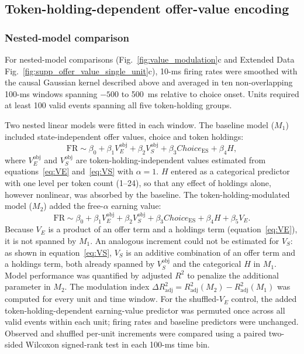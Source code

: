 \documentclass[pdflatex,sn-mathphys-num]{sn-jnl}%
\begin{document}
\subsection{Token-holding-dependent offer-value encoding}

\subsubsection{Nested-model comparison}\label{sec:m_nested}
For nested-model comparisons (Fig.~\ref{fig:value_modulation}c and Extended Data Fig.~\ref{fig:supp_offer_value_single_unit}c), 10-ms firing rates were smoothed with the causal Gaussian kernel described above and averaged in ten non-overlapping 100-ms windows spanning $-500$ to 500~ms relative to choice onset. Units required at least 100 valid events spanning all five token-holding groups.

Two nested linear models were fitted in each window. The baseline model ($M_1$) included state-independent offer values, choice and token holdings:
\begin{equation}
\mathrm{FR} \sim \beta_0 + \beta_1 V_E^{\mathrm{obj}} + \beta_2 V_S^{\mathrm{obj}} + \beta_3 \mathit{Choice}_{\mathrm{ES}} + \beta_4 H,
\end{equation}
where $V_E^{\mathrm{obj}}$ and $V_S^{\mathrm{obj}}$ are token-holding-independent values estimated from equations~\eqref{eq:VE} and~\eqref{eq:VS} with $\alpha=1$. $H$ entered as a categorical predictor with one level per token count (1--24), so that any effect of holdings alone, however nonlinear, was absorbed by the baseline. The token-holding-modulated model ($M_2$) added the free-$\alpha$ earning value:
\begin{equation}
\mathrm{FR} \sim \beta_0 + \beta_1 V_E^{\mathrm{obj}} + \beta_2 V_S^{\mathrm{obj}} + \beta_3 \mathit{Choice}_{\mathrm{ES}} + \beta_4 H + \beta_5 V_E.
\end{equation}
Because $V_E$ is a product of an offer term and a holdings term (equation~\eqref{eq:VE}), it is not spanned by $M_1$. An analogous increment could not be estimated for $V_S$: as shown in equation~\eqref{eq:VS}, $V_S$ is an additive combination of an offer term and a holdings term, both already spanned by $V_S^{\mathrm{obj}}$ and the categorical $H$ in $M_1$.
Model performance was quantified by adjusted $R^2$ to penalize the additional parameter in $M_2$. The modulation index $\Delta R^2_{\mathrm{adj}}=R^2_{\mathrm{adj}}(M_2)-R^2_{\mathrm{adj}}(M_1)$ was computed for every unit and time window. For the shuffled-$V_E$ control, the added token-holding-dependent earning-value predictor was permuted once across all valid events within each unit; firing rates and baseline predictors were unchanged. Observed and shuffled per-unit increments were compared using a paired two-sided Wilcoxon signed-rank test in each 100-ms time bin.
\end{document}
